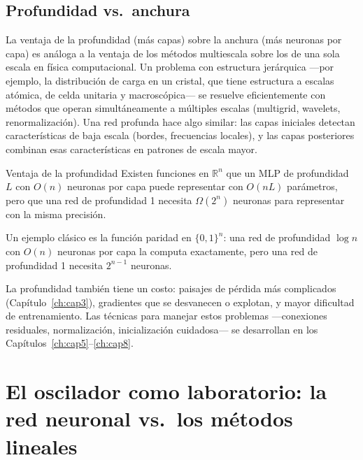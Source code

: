 \subsection{Profundidad vs.\ anchura}
\label{subsec:profundidad}

La ventaja de la profundidad (más capas) sobre la anchura (más neuronas
por capa) es análoga a la ventaja de los métodos multiescala sobre los
de una sola escala en física computacional. Un problema con estructura
jerárquica —por ejemplo, la distribución de carga en un cristal, que
tiene estructura a escalas atómica, de celda unitaria y macroscópica—
se resuelve eficientemente con métodos que operan simultáneamente a
múltiples escalas (multigrid, wavelets, renormalización). Una red
profunda hace algo similar: las capas iniciales detectan características
de baja escala (bordes, frecuencias locales), y las capas posteriores
combinan esas características en patrones de escala mayor.

\begin{proposicion}{Ventaja de la profundidad}
\label{prop:profundidad}
Existen funciones en $\mathbb{R}^n$ que un MLP de profundidad $L$ con
$O(n)$ neuronas por capa puede representar con $O(nL)$ parámetros,
pero que una red de profundidad 1 necesita $\Omega(2^n)$ neuronas para
representar con la misma precisión.
\end{proposicion}

Un ejemplo clásico es la función paridad en $\{0,1\}^n$: una red de
profundidad $\log n$ con $O(n)$ neuronas por capa la computa
exactamente, pero una red de profundidad 1 necesita $2^{n-1}$ neuronas.

La profundidad también tiene un costo: paisajes de pérdida más
complicados (Capítulo~\ref{ch:cap3}), gradientes que se desvanecen o
explotan, y mayor dificultad de entrenamiento. Las técnicas para
manejar estos problemas —conexiones residuales, normalización,
inicialización cuidadosa— se desarrollan en los
Capítulos~\ref{ch:cap5}--\ref{ch:cap8}.

\section{El oscilador como laboratorio: la red neuronal vs.\ los
  métodos lineales}
\label{sec:oscilador4}


